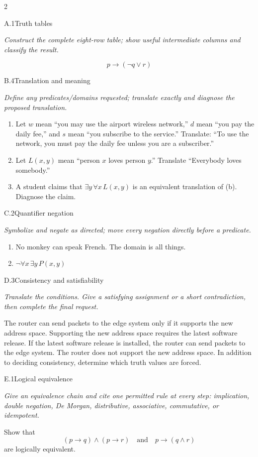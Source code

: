 \documentclass[9pt]{extarticle}
\begin{document}
\begin{multicols}{2}
\begin{CoreProblem}{A.1}{Truth tables}
{\scriptsize\textit{Construct the complete eight-row table; show useful intermediate columns and classify the result.}\par}
\[
  p\to(\neg q\lor r)
\]
\end{CoreProblem}
\begin{CoreProblem}{B.4}{Translation and meaning}
{\scriptsize\textit{Define any predicates/domains requested; translate exactly and diagnose the proposed translation.}\par}
\begin{enumerate}[label=(\alph*)]
  \item Let $w$ mean ``you may use the airport wireless network,'' $d$ mean
        ``you pay the daily fee,'' and $s$ mean ``you subscribe to the
        service.'' Translate: ``To use the network, you must pay the daily fee
        unless you are a subscriber.''
  \item Let $L(x,y)$ mean ``person $x$ loves person $y$.'' Translate
        ``Everybody loves somebody.''
  \item A student claims that $\exists y\,\forall x\,L(x,y)$ is an equivalent
        translation of (b). Diagnose the claim.
\end{enumerate}
\end{CoreProblem}
\begin{CoreProblem}{C.2}{Quantifier negation}
{\scriptsize\textit{Symbolize and negate as directed; move every negation directly before a predicate.}\par}
\begin{enumerate}[label=(\alph*)]
  \item No monkey can speak French. The domain is all things.
  \item $\neg\forall x\,\exists y\,P(x,y)$
\end{enumerate}
\end{CoreProblem}
\columnbreak
\begin{CoreProblem}{D.3}{Consistency and satisfiability}
{\scriptsize\textit{Translate the conditions. Give a satisfying assignment or a short contradiction, then complete the final request.}\par}
The router can send packets to the edge system only if it supports the new
address space. Supporting the new address space requires the latest software
release. If the latest software release is installed, the router can send
packets to the edge system. The router does not support the new address space.
In addition to deciding consistency, determine which truth values are forced.
\end{CoreProblem}
\begin{CoreProblem}{E.1}{Logical equivalence}
{\scriptsize\textit{Give an equivalence chain and cite one permitted rule at every step: implication, double negation, De Morgan, distributive, associative, commutative, or idempotent.}\par}
Show that
\[
  (p\to q)\land(p\to r)
  \quad\text{and}\quad
  p\to(q\land r)
\]
are logically equivalent.
\end{CoreProblem}
\end{multicols}
\end{document}
